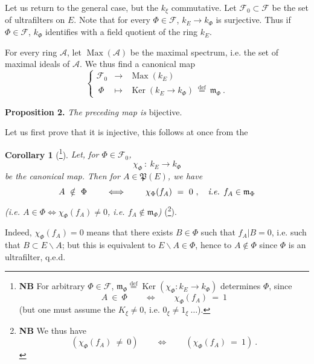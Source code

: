 \documentclass[11pt]{article}
\newcommand{\printedpage}[1]{\marginpar{\footnotesize p.~#1}}
\newcommand{\msp}[1]{\marginpar{\footnotesize [#1]}}
\newcommand{\cF}{\mathcal{F}}
\newcommand{\cA}{\mathcal{A}}
\newcommand{\Ker}{\operatorname{Ker}}
\newcommand{\Max}{\operatorname{Max}}
\newcommand{\defeq}{\overset{\text{def}}{=}}
\begin{document}
\noindent Let us return to the general case, but the $k_\xi$ commutative. Let $\cF_0\subset\cF$ be the set of ultrafilters on $E$. Note that for every $\Phi\in\cF$, $k_E\longrightarrow k_\Phi$ is surjective. Thus if $\Phi\in\cF$, $k_\Phi$ identifies with a field quotient of the ring $k_E$.

\printedpage{193}

\msp{page 5}
\noindent For every ring $\cA$, let $\Max(\cA)$ be the maximal spectrum, i.e. the set of maximal ideals of $\cA$. We thus find a canonical map
\[
\left\{
\begin{array}{lll}
\cF_0 & \longrightarrow & \Max(k_E)\\[1ex]
\ \Phi & \longmapsto & \Ker(k_E\longrightarrow k_\Phi) \ \defeq \ \mathfrak{m}_\Phi \ .
\end{array}\right. \tag*{$(*)$}
\]

\noindent\textbf{Proposition 2.} \textit{The preceding map is} bijective.

\noindent Let us first prove that it is injective, this follows at once from the

\noindent\textbf{Corollary 1} (\footnote[204]{\textbf{NB} For arbitrary $\Phi\in\cF$, $\mathfrak{m}_\Phi\defeq\Ker(\chi_\Phi : k_E\longrightarrow k_\Phi)$ determines $\Phi$, since
\[
A \ \in \ \Phi \qquad\iff\qquad \chi_\Phi(f_A) \ = \ 1
\]
(but one must assume the $K_\xi\neq0$, i.e. $0_\xi\neq1_\xi\ \ldots$).}). \textit{Let, for $\Phi\in\cF_0$,}
\[
\chi_\Phi \ : \ k_E \longrightarrow k_\Phi
\]
\textit{be the canonical map. Then for $A\in\mathfrak{P}(E)$, we have}
\[
A \ \notin \ \Phi \qquad\iff\qquad \chi_\Phi(f_A) \ = \ 0 \ , \quad \text{\textit{i.e.} } f_A\in\mathfrak{m}_\Phi
\]
\textit{(i.e. $A\in\Phi\iff\chi_\Phi(f_A)\neq0$, i.e. $f_A\notin\mathfrak{m}_\Phi$)} (\footnote[205]{\textbf{NB} We thus have
\[
(\chi_\Phi(f_A) \ \neq \ 0) \qquad\iff\qquad (\chi_\Phi(f_A) \ = \ 1) \ .
\]}).

\noindent Indeed, $\chi_\Phi(f_A)=0$ means that there exists $B\in\Phi$ such that $f_A|B=0$, i.e. such that $B\subset E\backslash A$; but this is equivalent to $E\backslash A\in\Phi$, hence to $A\notin\Phi$ since $\Phi$ is an ultrafilter, q.e.d.
\end{document}
